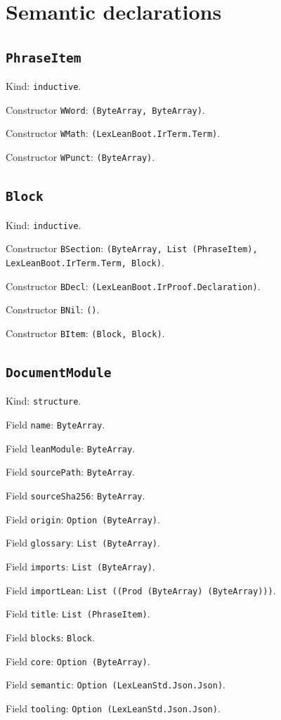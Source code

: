 \documentclass[11pt]{article}
\begin{document}
\section*{Semantic declarations}
\subsection*{\texttt{PhraseItem}}
\noindent Kind: \texttt{inductive}.\par
\noindent Constructor \texttt{WWord}: \texttt{(ByteArray, ByteArray)}.\par
\noindent Constructor \texttt{WMath}: \texttt{(LexLeanBoot.IrTerm.Term)}.\par
\noindent Constructor \texttt{WPunct}: \texttt{(ByteArray)}.\par
\subsection*{\texttt{Block}}
\noindent Kind: \texttt{inductive}.\par
\noindent Constructor \texttt{BSection}: \texttt{(ByteArray, List (PhraseItem), LexLeanBoot.IrTerm.Term, Block)}.\par
\noindent Constructor \texttt{BDecl}: \texttt{(LexLeanBoot.IrProof.Declaration)}.\par
\noindent Constructor \texttt{BNil}: \texttt{()}.\par
\noindent Constructor \texttt{BItem}: \texttt{(Block, Block)}.\par
\subsection*{\texttt{DocumentModule}}
\noindent Kind: \texttt{structure}.\par
\noindent Field \texttt{name}: \texttt{ByteArray}.\par
\noindent Field \texttt{leanModule}: \texttt{ByteArray}.\par
\noindent Field \texttt{sourcePath}: \texttt{ByteArray}.\par
\noindent Field \texttt{sourceSha256}: \texttt{ByteArray}.\par
\noindent Field \texttt{origin}: \texttt{Option (ByteArray)}.\par
\noindent Field \texttt{glossary}: \texttt{List (ByteArray)}.\par
\noindent Field \texttt{imports}: \texttt{List (ByteArray)}.\par
\noindent Field \texttt{importLean}: \texttt{List ((Prod (ByteArray) (ByteArray)))}.\par
\noindent Field \texttt{title}: \texttt{List (PhraseItem)}.\par
\noindent Field \texttt{blocks}: \texttt{Block}.\par
\noindent Field \texttt{core}: \texttt{Option (ByteArray)}.\par
\noindent Field \texttt{semantic}: \texttt{Option (LexLeanStd.Json.Json)}.\par
\noindent Field \texttt{tooling}: \texttt{Option (LexLeanStd.Json.Json)}.\par
\end{document}
